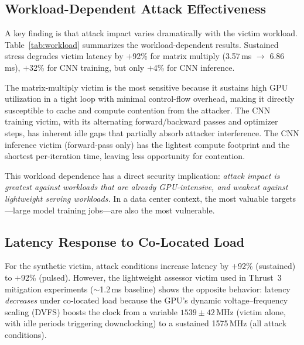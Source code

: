 \documentclass[conference]{IEEEtran}
\begin{document}
\subsection{Workload-Dependent Attack Effectiveness}
\label{sec:workload}

A key finding is that attack impact varies dramatically with the
victim workload.  Table~\ref{tab:workload} summarizes the
workload-dependent results.  Sustained stress degrades victim latency
by $+$92\% for matrix multiply (3.57\,ms $\to$ 6.86\,ms), $+$32\% for
CNN training, but only $+$4\% for CNN inference.

\begin{table}[t]
\centering
\caption{Workload-dependent attack effectiveness.  Degradation is
  the percentage increase in victim latency under sustained stress
  versus the victim-alone baseline.}
\label{tab:workload}

\end{table}

The matrix-multiply victim is the most sensitive because it sustains
high GPU utilization in a tight loop with minimal control-flow
overhead, making it directly susceptible to cache and compute
contention from the attacker.  The CNN training victim, with its
alternating forward/backward passes and optimizer steps, has inherent
idle gaps that partially absorb attacker interference.  The CNN
inference victim (forward-pass only) has the lightest compute
footprint and the shortest per-iteration time, leaving less
opportunity for contention.

This workload dependence has a direct security implication:
\emph{attack impact is greatest against workloads that are already
GPU-intensive, and weakest against lightweight serving workloads.}
In a data center context, the most valuable targets---large model
training jobs---are also the most vulnerable.

\subsection{Latency Response to Co-Located Load}
\label{sec:latency}

For the synthetic victim, attack conditions increase latency by
$+$92\% (sustained) to $+$92\% (pulsed).  However, the lightweight
assessor victim used in Thrust~3 mitigation experiments ($\sim$1.2\,ms
baseline) shows the opposite behavior: latency \emph{decreases}
under co-located load because the GPU's dynamic voltage--frequency
scaling (DVFS) boosts the clock from a variable $1539 \pm 42$\,MHz
(victim alone, with idle periods triggering downclocking) to a
sustained 1575\,MHz (all attack conditions).
\end{document}
